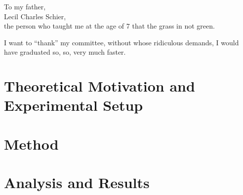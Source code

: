\documentclass[11pt]{ucthesis}
\begin{document}
\begin{frontmatter}
\begin{abstract}
\end{abstract}

\begin{dedication}
\null\vfil
{\large
\begin{center}
To my father,\\\vspace{12pt}
Lecil Charles Schier,\\\vspace{12pt}
the person who taught me at the age of 7 that the grass in not green.
\end{center}}
\vfil\null
\end{dedication}


\begin{acknowledgements}
I want to ``thank'' my committee, without whose ridiculous demands, I
would have graduated so, so, very much faster.
\end{acknowledgements}

\end{frontmatter}


\part{Theoretical Motivation and Experimental Setup}


\part{Method}





\part{Analysis and Results}






\nocite{*}


\iffalse
\appendix



Ancillary material should be put in appendices, which appear after the
bibliography. 
\fi
\end{document}

